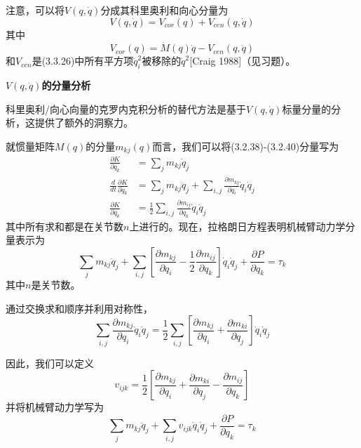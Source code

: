 \documentclass[12pt,a4paper]{ctexart}
\begin{document}
注意，可以将$V(q,\dot{q})$分成其科里奥利和向心分量为
\begin{equation}
V(q,\dot{q}) = V_{cor}(q) + V_{cen}(q,\dot{q})
\end{equation}
其中
\begin{equation}
V_{cor}(q) = \dot{M}(q)\dot{q} - V_{cen}(q,\dot{q})
\end{equation}
和$V_{cen}$是(3.3.26)中所有平方项$\dot{q}_i^2$被移除的$\dot{q}^2$[Craig 1988]（见习题）。

\textbf{$V(q,\dot{q})$的分量分析}

科里奥利/向心向量的克罗内克积分析的替代方法是基于$V(q,\dot{q})$标量分量的分析，这提供了额外的洞察力。

就惯量矩阵$M(q)$的分量$m_{kj}(q)$而言，我们可以将(3.2.38)-(3.2.40)分量写为
\begin{align}
\frac{\partial K}{\partial \dot{q}_k} &= \sum_{j}m_{kj}\dot{q}_j \\
\frac{d}{dt}\frac{\partial K}{\partial \dot{q}_k} &= \sum_{j}m_{kj}\ddot{q}_j + \sum_{i,j}\frac{\partial m_{kj}}{\partial q_i}\dot{q}_i\dot{q}_j \\
\frac{\partial K}{\partial q_k} &= \frac{1}{2}\sum_{i,j}\frac{\partial m_{ij}}{\partial q_k}\dot{q}_i\dot{q}_j
\end{align}
其中所有求和都是在关节数$n$上进行的。现在，拉格朗日方程表明机械臂动力学分量表示为
\begin{equation}
\sum_{j}m_{kj}\ddot{q}_j + \sum_{i,j}\left[\frac{\partial m_{kj}}{\partial q_i} - \frac{1}{2}\frac{\partial m_{ij}}{\partial q_k}\right]\dot{q}_i\dot{q}_j + \frac{\partial P}{\partial q_k} = \tau_k
\end{equation}
其中$n$是关节数。

通过交换求和顺序并利用对称性，
\begin{equation}
\sum_{i,j}\frac{\partial m_{kj}}{\partial q_i}\dot{q}_i\dot{q}_j = \frac{1}{2}\sum_{i,j}\left[\frac{\partial m_{kj}}{\partial q_i} + \frac{\partial m_{ki}}{\partial q_j}\right]\dot{q}_i\dot{q}_j
\end{equation}

因此，我们可以定义
\begin{equation}
v_{ijk} = \frac{1}{2}\left[\frac{\partial m_{kj}}{\partial q_i} + \frac{\partial m_{ki}}{\partial q_j} - \frac{\partial m_{ij}}{\partial q_k}\right]
\end{equation}
并将机械臂动力学写为
\begin{equation}
\sum_{j}m_{kj}\ddot{q}_j + \sum_{i,j}v_{ijk}\dot{q}_i\dot{q}_j + \frac{\partial P}{\partial q_k} = \tau_k
\end{equation}
\end{document}

